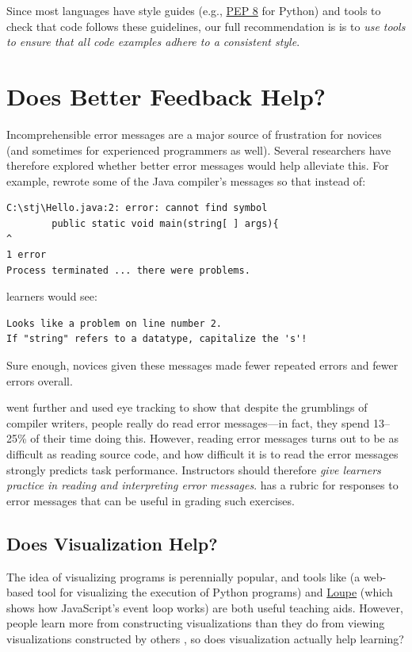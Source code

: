 Since most languages have style guides (e.g.,
\href{https://www.python.org/dev/peps/pep-0008/}{PEP 8} for Python)
and tools to check that code follows these guidelines, our full
recommendation is is to \emph{use tools to ensure that all code
  examples adhere to a consistent style}.

\section{Does Better Feedback Help?}\label{s:pck-error}

Incomprehensible error messages are a major source of frustration for
novices (and sometimes for experienced programmers as well).  Several
researchers have therefore explored whether better error messages
would help alleviate this.  For example, \cite{Beck2016} rewrote some
of the Java compiler's messages so that instead of:

\begin{verbatim}
C:\stj\Hello.java:2: error: cannot find symbol
        public static void main(string[ ] args){
^
1 error
Process terminated ... there were problems.
\end{verbatim}

\noindent
learners would see:

\begin{verbatim}
Looks like a problem on line number 2.
If "string" refers to a datatype, capitalize the 's'!
\end{verbatim}

\noindent
Sure enough, novices given these messages made fewer repeated errors
and fewer errors overall.

\cite{Bari2017} went further and used eye tracking to show that
despite the grumblings of compiler writers, people really do read
error messages---in fact, they spend 13--25\% of their time doing
this.  However, reading error messages turns out to be as difficult as
reading source code, and how difficult it is to read the error
messages strongly predicts task performance.  Instructors should
therefore \emph{give learners practice in reading and interpreting
  error messages}.  \cite{Marc2011} has a rubric for responses to
error messages that can be useful in grading such exercises.

\subsection*{Does Visualization Help?}

The idea of visualizing programs is perennially popular, and tools
like \cite{Guo2013} (a web-based tool for visualizing the execution of
Python programs) and \href{http://latentflip.com/loupe/}{Loupe} (which
shows how JavaScript's event loop works) are both useful teaching
aids.  However, people learn more from constructing visualizations
than they do from viewing visualizations constructed by others
\cite{Stas1998,Ceti2016}, so does visualization actually help
learning?

